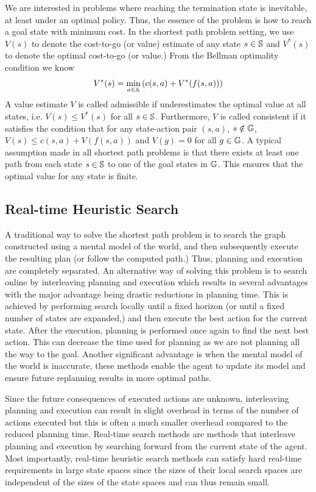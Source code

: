 We are interested in problems where reaching the termination state is
inevitable, at least under an optimal policy. Thus, the essence of the
problem is how to reach a goal state with minimum cost. In the
shortest path problem setting, we use $V(s)$ to denote the cost-to-go
(or value) estimate of any state $s \in \mathbb{S}$ and $V^*(s)$ to
denote the optimal cost-to-go (or value.) From the Bellman optimality
condition we know
\begin{equation}
  \label{eq:9}
  V^*(s) = \min_{a \in \mathbb{A}}\left( c(s, a) + V^*(f(s, a)) \right)
\end{equation}
A value estimate $V$ is called admissible if underestimates the
optimal value at all states, i.e. $V(s) \leq V^*(s)$ for all $s \in
\mathbb{S}$. Furthermore, $V$ is called consistent if it satisfies
the condition that for any state-action pair $(s, a)$, $s \notin
\mathbb{G}$, $V(s) \leq c(s, a) + V(f(s, a))$ and $V(g) = 0$ for all
$g \in \mathbb{G}$.
A typical assumption made in all shortest path problems is that there
exists at least one path from each state $s \in \mathbb{S}$ to one of
the goal states in $\mathbb{G}$. This ensures that the optimal value
for any state is finite.

\subsection{Real-time Heuristic Search}
\label{sec:real-time-heuristic-1}

A traditional way to solve the shortest path problem is to search the
graph constructed using a mental model of the world, and then
subsequently execute the resulting plan (or follow the computed path.)
Thus, planning and execution are completely separated. An alternative
way of solving this problem is to search online by interleaving
planning and execution which results in several advantages with the
major advantage being drastic reductions in planning time. This is
achieved by performing search locally until a fixed horizon (or until
a fixed number of states are expanded,) and then execute the best
action for the current state. After the execution, planning is
performed once again to find the next best action. This can decrease
the time used for planning as we are not planning all the way to the
goal. Another significant advantage is when the mental model of the
world is inaccurate, these methods enable the agent to update its
model and ensure future replanning results in more optimal paths.

Since the future consequences of executed actions are unknown,
interleaving planning and execution can result in slight overhead in
terms of the number of actions executed but this is often a much
smaller overhead compared to the reduced planning time. Real-time
search methods are methods that interleave planning and execution by
searching forward from the current state of the agent. Most
importantly, real-time heuristic search methods can satisfy hard
real-time requirements in large state spaces since the sizes of their
local search spaces are independent of the sizes
of the state spaces and can thus remain small. 

